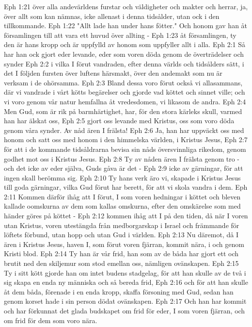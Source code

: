 Eph 1:21  över alla andevärldens furstar och väldigheter och makter och herrar, ja, över allt som kan nämnas, icke allenast i denna tidsålder, utan ock i den tillkommande.
Eph 1:22  "Allt lade han under hans fötter." Och honom gav han åt församlingen till att vara ett huvud över allting -
Eph 1:23  åt församlingen, ty den är hans kropp och är uppfylld av honom som uppfyller allt i alla.
Eph 2:1  Så har han ock gjort eder levande, eder som voren döda genom de överträdelser och synder
Eph 2:2  i vilka I förut vandraden, efter denna världs och tidsålders sätt, i det I följden fursten över luftens härsmakt, över den andemakt som nu är verksam i de ohörsamma.
Eph 2:3  Bland dessa voro förut också vi allasammans, där vi vandrade i vårt kötts begärelser och gjorde vad köttet och sinnet ville; och vi voro genom vår natur hemfallna åt vredesdomen, vi likasom de andra.
Eph 2:4  Men Gud, som är rik på barmhärtighet, har, för den stora kärleks skull, varmed han har älskat oss,
Eph 2:5  gjort oss levande med Kristus, oss som voro döda genom våra synder. Av nåd ären I frälsta!
Eph 2:6  Ja, han har uppväckt oss med honom och satt oss med honom i den himmelska världen, i Kristus Jesus,
Eph 2:7  för att i de kommande tidsåldrarna bevisa sin nåds översvinnliga rikedom, genom godhet mot oss i Kristus Jesus.
Eph 2:8  Ty av nåden ären I frälsta genom tro - och det icke av eder själva, Guds gåva är det -
Eph 2:9  icke av gärningar, för att ingen skall berömma sig.
Eph 2:10  Ty hans verk äro vi, skapade i Kristus Jesus till goda gärningar, vilka Gud förut har berett, för att vi skola vandra i dem.
Eph 2:11  Kommen därför ihåg att I förut, I som voren hedningar i köttet och bleven kallade oomskurna av dem som kallas omskurna, efter den omskärelse som med händer göres på köttet -
Eph 2:12  kommen ihåg att I på den tiden, då när I voren utan Kristus, voren utestängda från medborgarskap i Israel och främmande för löftets förbund, utan hopp och utan Gud i världen.
Eph 2:13  Nu däremot, då I ären i Kristus Jesus, haven I, som förut voren fjärran, kommit nära, i och genom Kristi blod.
Eph 2:14  Ty han är vår frid, han som av de båda har gjort ett och brutit ned den skiljemur som stod emellan oss, nämligen ovänskapen.
Eph 2:15  Ty i sitt kött gjorde han om intet budens stadgelag, för att han skulle av de två i sig skapa en enda ny människa och så bereda frid,
Eph 2:16  och för att han skulle åt dem båda, förenade i en enda kropp, skaffa försoning med Gud, sedan han genom korset hade i sin person dödat ovänskapen.
Eph 2:17  Och han har kommit och har förkunnat det glada budskapet om frid för eder, I som voren fjärran, och om frid för dem som voro nära.
